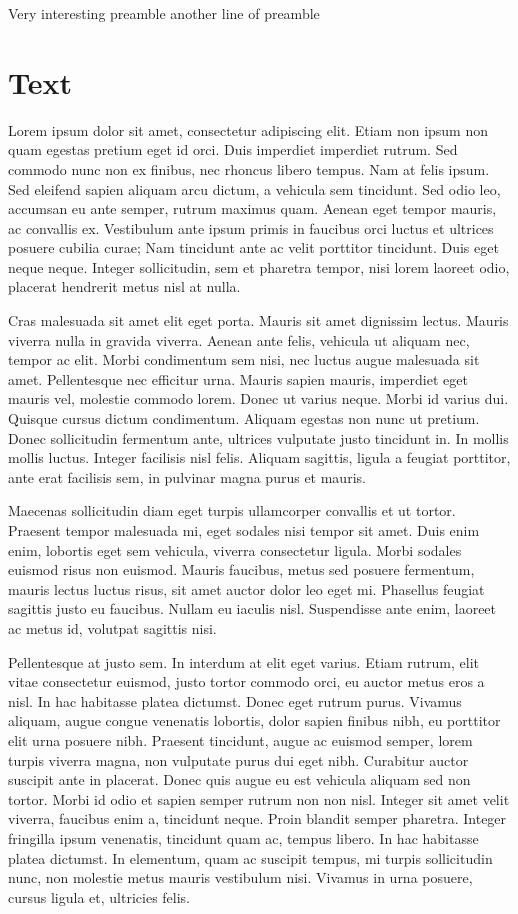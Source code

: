Very interesting preamble
another line of preamble

\section{Text}
Lorem ipsum dolor sit amet, consectetur adipiscing elit. Etiam non ipsum non quam egestas pretium eget id orci. Duis imperdiet imperdiet rutrum. Sed commodo nunc non ex finibus, nec rhoncus libero tempus. Nam at felis ipsum. Sed eleifend sapien aliquam arcu dictum, a vehicula sem tincidunt. Sed odio leo, accumsan eu ante semper, rutrum maximus quam. Aenean eget tempor mauris, ac convallis ex. Vestibulum ante ipsum primis in faucibus orci luctus et ultrices posuere cubilia curae; Nam tincidunt ante ac velit porttitor tincidunt. Duis eget neque neque. Integer sollicitudin, sem et pharetra tempor, nisi lorem laoreet odio, placerat hendrerit metus nisl at nulla.

Cras malesuada sit amet elit eget porta. Mauris sit amet dignissim lectus. Mauris viverra nulla in gravida viverra. Aenean ante felis, vehicula ut aliquam nec, tempor ac elit. Morbi condimentum sem nisi, nec luctus augue malesuada sit amet. Pellentesque nec efficitur urna. Mauris sapien mauris, imperdiet eget mauris vel, molestie commodo lorem. Donec ut varius neque. Morbi id varius dui. Quisque cursus dictum condimentum. Aliquam egestas non nunc ut pretium. Donec sollicitudin fermentum ante, ultrices vulputate justo tincidunt in. In mollis mollis luctus. Integer facilisis nisl felis. Aliquam sagittis, ligula a feugiat porttitor, ante erat facilisis sem, in pulvinar magna purus et mauris.

Maecenas sollicitudin diam eget turpis ullamcorper convallis et ut tortor. Praesent tempor malesuada mi, eget sodales nisi tempor sit amet. Duis enim enim, lobortis eget sem vehicula, viverra consectetur ligula. Morbi sodales euismod risus non euismod. Mauris faucibus, metus sed posuere fermentum, mauris lectus luctus risus, sit amet auctor dolor leo eget mi. Phasellus feugiat sagittis justo eu faucibus. Nullam eu iaculis nisl. Suspendisse ante enim, laoreet ac metus id, volutpat sagittis nisi.

Pellentesque at justo sem. In interdum at elit eget varius. Etiam rutrum, elit vitae consectetur euismod, justo tortor commodo orci, eu auctor metus eros a nisl. In hac habitasse platea dictumst. Donec eget rutrum purus. Vivamus aliquam, augue congue venenatis lobortis, dolor sapien finibus nibh, eu porttitor elit urna posuere nibh. Praesent tincidunt, augue ac euismod semper, lorem turpis viverra magna, non vulputate purus dui eget nibh. Curabitur auctor suscipit ante in placerat. Donec quis augue eu est vehicula aliquam sed non tortor. Morbi id odio et sapien semper rutrum non non nisl. Integer sit amet velit viverra, faucibus enim a, tincidunt neque. Proin blandit semper pharetra. Integer fringilla ipsum venenatis, tincidunt quam ac, tempus libero. In hac habitasse platea dictumst. In elementum, quam ac suscipit tempus, mi turpis sollicitudin nunc, non molestie metus mauris vestibulum nisi. Vivamus in urna posuere, cursus ligula et, ultricies felis.

